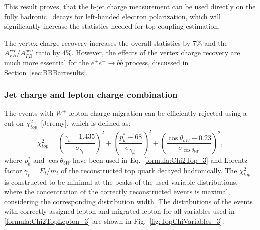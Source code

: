 This result proves, that the  b-jet charge measurement can be used directly on the fully hadronic \ttbar\ decays for left-handed electron polarization, which will significantly increase the statistics needed for top coupling estimation. 

The vertex charge recovery increases the overall statistics by 7\% and the $A_{FB}^{rec}/A^{gen}_{FB}$ ratio by 4\%. 
However, the effects of the vertex charge recovery are much more essential for the $e^+e^-\to b\bar{b}$ process, discussed in Section~\ref{sec:BBBarresults}.

\subsubsection{Jet charge and lepton charge combination}

The events with $W^\pm$ lepton charge migration can be efficiently rejected using  a cut on $\chi^2_{top}$~[Jeremy], which is defined as:
\begin{equation}
	\label{formula:Chi2TopLepton_3}
	\chi^2_{top} = (\frac{\gamma_t-1.435}{\sigma_{\gamma_{t}}})^2 + (\frac{p^*_b-68}{\sigma_{\gamma_{p^*_b}}})^2 + (\frac{\cos\theta_{bW} - 0.23}{\sigma_{\cos\theta_{bW}}})^2,
\end{equation}
where $p^*_b$ and $\cos\theta_{bW}$ have been used in Eq.~\ref{formula:Chi2Top_3} and Lorentz factor $\gamma_t=E_{t}/m_{t}$ of the reconstructed top quark decayed hadronically. The $\chi^2_{top}$ is constructed to be minimal at the peaks of the used variable distributions, where the concentration of the correctly reconstructed events is maximal, considering the corresponding distribution width.
The distributions of the events with correctly assigned lepton and migrated lepton for all variables used in \ref{formula:Chi2TopLepton_3} are shown in Fig.~\ref{fig:TopChiVariables_3}.

